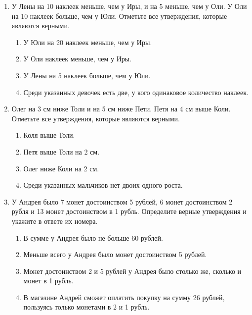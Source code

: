 \documentclass[a4paper,12pt]{article}
\newcommand{\taskspace}{\par\vspace{0.42cm}}
\begin{document}
\begin{enumerate}[resume]
\item У Лены на 10 наклеек меньше, чем у Иры, и на 5 меньше, чем у Оли. У Оли на 10 наклеек больше, чем у Юли. Отметьте все утверждения, которые являются верными.
\begin{enumerate}[label=\arabic*),leftmargin=8mm,itemsep=0.25em,topsep=0.35em]
\item У Юли на 20 наклеек меньше, чем у Иры.
\item У Оли наклеек меньше, чем у Иры.
\item У Лены на 5 наклеек больше, чем у Юли.
\item Среди указанных девочек есть две, у кого одинаковое количество наклеек.
\end{enumerate}

\taskspace

\item Олег на 3 см ниже Толи и на 5 см ниже Пети. Петя на 4 см выше Коли. Отметьте все утверждения, которые являются верными.
\begin{enumerate}[label=\arabic*),leftmargin=8mm,itemsep=0.25em,topsep=0.35em]
\item Коля выше Толи.
\item Петя выше Толи на 2 см.
\item Олег ниже Коли на 2 см.
\item Среди указанных мальчиков нет двоих одного роста.
\end{enumerate}

\taskspace

\item У Андрея было 7 монет достоинством 5 рублей, 6 монет достоинством 2 рубля и 13 монет достоинством в 1 рубль. Определите верные утверждения и укажите в ответе их номера.
\begin{enumerate}[label=\arabic*),leftmargin=8mm,itemsep=0.25em,topsep=0.35em]
\item В сумме у Андрея было не больше 60 рублей.
\item Меньше всего у Андрея было монет достоинством 5 рублей.
\item Монет достоинством 2 и 5 рублей у Андрея было столько же, сколько и монет в 1 рубль.
\item В магазине Андрей сможет оплатить покупку на сумму 26 рублей, пользуясь только монетами в 2 и 1 рубль.
\end{enumerate}

\taskspace


\end{enumerate}
\end{document}
